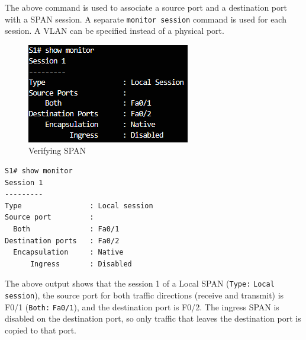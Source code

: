 The above command is used to associate a source port and a destination port with a SPAN session. A separate \verb|monitor session| command is used for each session. A VLAN can be specified instead of a physical port. \\

\begin{figure}[hbtp]
\caption{Verifying SPAN}\label{SPAN}
\centering
\includegraphics[scale=0.8]{pictures/SPAN.PNG}
\end{figure}

\begin{verbatim}
S1# show monitor
Session 1
---------
Type                : Local session
Source port         : 
  Both              : Fa0/1
Destination ports   : Fa0/2
  Encapsulation     : Native
      Ingress       : Disabled
\end{verbatim}

The above output shows that the session 1 of a Local SPAN (\verb|Type:| \verb|Local session|), the source port for both traffic directions (receive and transmit) is F0/1 (\verb|Both:| \verb|Fa0/1|), and the destination port is F0/2. The ingress SPAN is disabled on the destination port, so only traffic that leaves the destination port is copied to that port.

